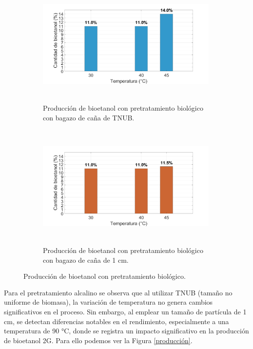 \documentclass[12pt]{article}
\begin{document}
			\begin{figure}[H]
				\centering
				\begin{subfigure}[b]{8 cm}
					\includegraphics[width=9cm, height=6.2cm]{imagenes/biologico_TNUB}
					\caption{Producción de bioetanol con pretratamiento biológico con bagazo de caña  de TNUB.}
					\label{fig:imagen1}
				\end{subfigure}
				\hfill %
				\begin{subfigure}[b]{8 cm}
					\includegraphics[width=9cm, height=6.2cm]{imagenes/biologico_11}
					\caption{Producción de bioetanol con pretratamiento biológico con bagazo de caña de 1 cm.}
					\label{fig:imagen2}
				\end{subfigure}
				\caption{Producción de bioetanol con pretratamiento biológico.}
				\label{fig:pareja}
			\end{figure}

		
			
			
		
		Para el pretratamiento alcalino se observa que al utilizar TNUB (tamaño no uniforme de biomasa), la variación de temperatura no genera cambios significativos en el proceso. Sin embargo, al emplear un tamaño de partícula de 1 cm, se detectan diferencias notables en el rendimiento, especialmente a una temperatura de 90 °C, donde se registra un impacto significativo en la producción de bioetanol 2G. Para ello podemos ver la Figura \ref{producción}.
			
\end{document}

